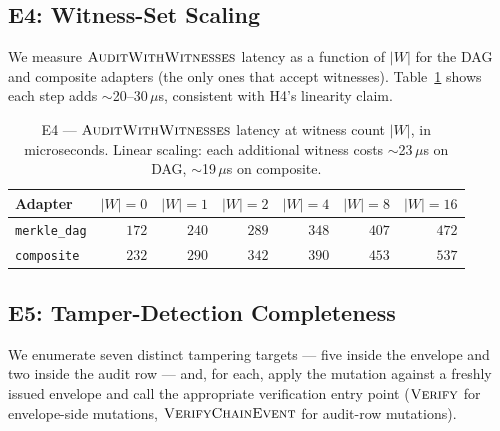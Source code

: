 \documentclass[11pt,a4paper]{article}
\begin{document}
\subsection{E4: Witness-Set Scaling}\label{sec:e4}

We measure $\textsc{AuditWithWitnesses}$ latency as a function of $|W|$
for the DAG and composite adapters (the only ones that accept
witnesses). Table~\ref{tab:e4} shows each step adds $\sim$20--30$\,\mu$s,
consistent with H4's linearity claim.

\begin{table}[h]
\centering
\small
\caption{E4 --- $\textsc{AuditWithWitnesses}$ latency at witness count
$|W|$, in microseconds. Linear scaling: each additional witness costs
$\sim$23$\,\mu$s on DAG, $\sim$19$\,\mu$s on composite.}\label{tab:e4}
\begin{tabular}{lrrrrrr}
\toprule
Adapter & $|W|=0$ & $|W|=1$ & $|W|=2$ & $|W|=4$ & $|W|=8$ & $|W|=16$ \\
\midrule
\texttt{merkle\_dag}  & $172$ & $240$ & $289$ & $348$ & $407$ & $472$ \\
\texttt{composite}    & $232$ & $290$ & $342$ & $390$ & $453$ & $537$ \\
\bottomrule
\end{tabular}
\end{table}

\subsection{E5: Tamper-Detection Completeness}\label{sec:e5}

We enumerate seven distinct tampering targets --- five inside the
envelope and two inside the audit row --- and, for each, apply the
mutation against a freshly issued envelope and call the appropriate
verification entry point ($\textsc{Verify}$ for envelope-side mutations,
$\textsc{VerifyChainEvent}$ for audit-row mutations).
\end{document}

